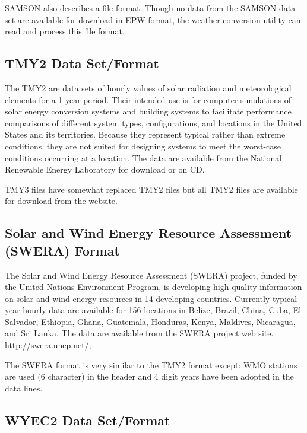 SAMSON also describes a file format. Though no data from the SAMSON data set are available for download in EPW format, the weather conversion utility can read and process this file format.

\subsection{TMY2 Data Set/Format}\label{tmy2-data-setformat}

The TMY2 are data sets of hourly values of solar radiation and meteorological elements for a 1-year period. Their intended use is for computer simulations of solar energy conversion systems and building systems to facilitate performance comparisons of different system types, configurations, and locations in the United States and its territories. Because they represent typical rather than extreme conditions, they are not suited for designing systems to meet the worst-case conditions occurring at a location. The data are available from the National Renewable Energy Laboratory for download or on CD.

TMY3 files have somewhat replaced TMY2 files but all TMY2 files are available for download from the website.

\subsection{Solar and Wind Energy Resource Assessment (SWERA) Format}\label{solar-and-wind-energy-resource-assessment-swera-format}

The Solar and Wind Energy Resource Assessment (SWERA) project, funded by the United Nations Environment Program, is developing high quality information on solar and wind energy resources in 14 developing countries. Currently typical year hourly data are available for 156 locations in Belize, Brazil, China, Cuba, El Salvador, Ethiopia, Ghana, Guatemala, Honduras, Kenya, Maldives, Nicaragua, and Sri Lanka. The data are available from the SWERA project web site. \url{http://swera.unep.net/};

The SWERA format is very similar to the TMY2 format except: WMO stations are used (6 character) in the header and 4 digit years have been adopted in the data lines.

\subsection{WYEC2 Data Set/Format}\label{wyec2-data-setformat}

